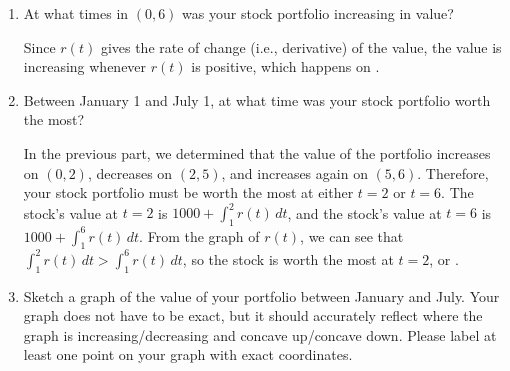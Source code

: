 \documentclass{article}
\begin{document}
\begin{enumerate}
\begin{enumerate}
  \item
    \begin{problem}[\vfill]
      At what times in $(0, 6)$ was your stock portfolio increasing in
      value?
    \end{problem}

    \begin{solution}
      Since $r(t)$ gives the rate of change (i.e., derivative) of the
      value, the value is increasing whenever $r(t)$ is positive, which
      happens on .
    \end{solution}

  \item
    \begin{problem}[\vfill]
      Between January 1 and July 1, at what time was your stock portfolio
      worth the most?
    \end{problem}

    \begin{solution}
      In the previous part, we determined that the value of the portfolio
      increases on $(0, 2)$, decreases on $(2, 5)$, and increases again on
      $(5, 6)$. Therefore, your stock portfolio must be worth the most at
      either $t = 2$ or $t = 6$.  The stock's value at $t = 2$ is $1000 +
      \displaystyle \int_1^2 r(t)\,dt$, and the stock's value at $t = 6$
      is $1000 + \displaystyle \int_1^6 r(t)\,dt$.  From the graph of
      $r(t)$, we can see that $\displaystyle \int_1^2 r(t)\,dt > \int_1^6
      r(t)\,dt$, so the stock is worth the most at $\boxed{t = 2}$, or
      .
    \end{solution}
    
\pspace{\newpage}

  \item \label{spring2010-final-review-1-sketch-value-graph} 
    \begin{problem}[\stretch{4}]
      Sketch a graph of the value of your portfolio between January and
      July.  Your graph does not have to be exact, but it should
      accurately reflect where the graph is increasing/decreasing and
      concave up/concave down.  Please label at least one point on your
      graph with exact coordinates. 
    \end{problem}


\end{enumerate}
\end{enumerate}
\end{document}
